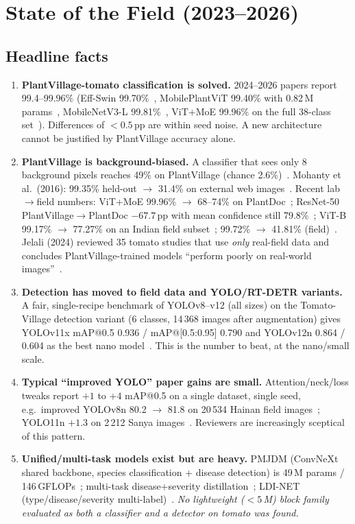 \section{State of the Field (2023--2026)}
\label{sec:sota}

\subsection{Headline facts}
\begin{enumerate}
  \item \textbf{PlantVillage-tomato classification is solved.} 2024--2026 papers report 99.4--99.96\% (Eff-Swin 99.70\%~\cite{effswin}, MobilePlantViT 99.40\% with 0.82\,M params~\cite{hoang2026}, MobileNetV3-L 99.81\%~\cite{mnv3edge}, ViT+MoE 99.96\% on the full 38-class set~\cite{salman2025}). Differences of $<0.5$\,pp are within seed noise. A new architecture cannot be justified by PlantVillage accuracy alone.
  \item \textbf{PlantVillage is background-biased.} A classifier that sees only 8 background pixels reaches 49\% on PlantVillage (chance 2.6\%)~\cite{noyan2022}. Mohanty et al.\ (2016): 99.35\% held-out $\to$ 31.4\% on external web images~\cite{mohanty2016}. Recent lab$\to$field numbers: ViT+MoE 99.96\% $\to$ 68--74\% on PlantDoc~\cite{salman2025}; ResNet-50 PlantVillage$\to$PlantDoc $-67.7$\,pp with mean confidence still 79.8\%~\cite{fpls2026gap}; ViT-B 99.17\% $\to$ 77.27\% on an Indian field subset~\cite{eja2025}; 99.72\% $\to$ 41.81\% (field)~\cite{yang2024}. Jelali (2024) reviewed 35 tomato studies that use \emph{only} real-field data and concludes PlantVillage-trained models ``perform poorly on real-world images''~\cite{jelali2024}.
  \item \textbf{Detection has moved to field data and YOLO/RT-DETR variants.} A fair, single-recipe benchmark of YOLOv8--v12 (all sizes) on the Tomato-Village detection variant (6 classes, 14\,368 images after augmentation) gives YOLOv11x mAP@0.5 0.936 / mAP@[0.5:0.95] 0.790 and YOLOv12n 0.864 / 0.604 as the best nano model~\cite{ramos2025}. This is the number to beat, at the nano/small scale.
  \item \textbf{Typical ``improved YOLO'' paper gains are small.} Attention/neck/loss tweaks report $+1$ to $+4$ mAP@0.5 on a single dataset, single seed, e.g.\ improved YOLOv8n 80.2 $\to$ 81.8 on 20\,534 Hainan field images~\cite{chen2025yolov8n}; YOLO11n $+1.3$ on 2\,212 Sanya images~\cite{meng2025}. Reviewers are increasingly sceptical of this pattern.
  \item \textbf{Unified/multi-task models exist but are heavy.} PMJDM (ConvNeXt shared backbone, species classification + disease detection) is 49\,M params / 146\,GFLOPs~\cite{pmjdm}; multi-task disease+severity distillation~\cite{liu2024mt}; LDI-NET (type/disease/severity multi-label)~\cite{ldinet}. \emph{No lightweight ($<5$\,M) block family evaluated as both a classifier and a detector on tomato was found.}

\end{enumerate}
